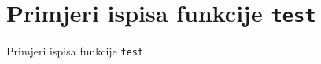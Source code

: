 \chapter{Primjeri ispisa funkcije \texttt{test}}
\label{ch:primjeri-ispisa-funkcije-test}
Primjeri ispisa funkcije \texttt{test} %
